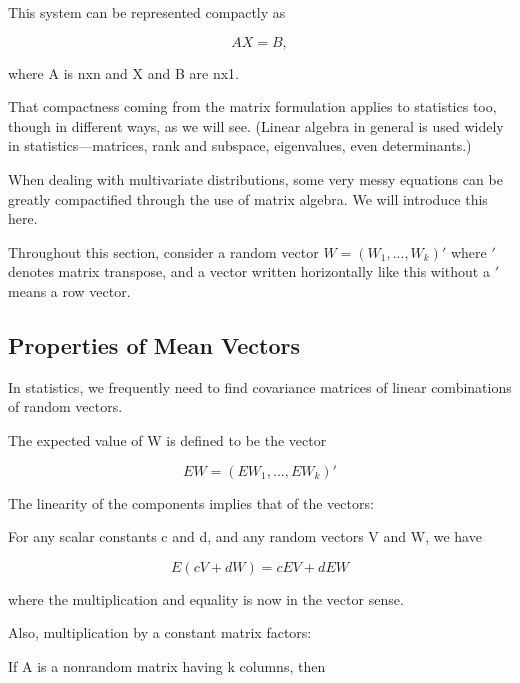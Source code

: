 This system can be represented compactly as

\begin{equation}
\label{lin}
AX = B,
\end{equation}

where A is nxn and X and B are nx1.

That compactness coming from the matrix formulation applies to
statistics too, though in different ways, as we will see.  (Linear
algebra in general is used widely in statistics---matrices, rank and
subspace, eigenvalues, even determinants.)

When dealing with multivariate distributions, some very messy equations
can be greatly compactified through the use of matrix algebra.  We will
introduce this here.

Throughout this section, consider a random vector $W = (W_1,...,W_k)'$
where $'$ denotes matrix transpose, and a vector written horizontally like
this without a $'$ means a row vector.

\subsection{Properties of Mean Vectors}

In statistics, we frequently need to find covariance matrices of linear
combinations of random vectors.

\begin{definition}

The expected value of W is defined to be the vector

\begin{equation}
\label{evalrandvec}
EW = (EW_1,...,EW_k)'
\end{equation}

\end{definition}

The linearity of the components implies that of the vectors:  

For any scalar constants c and d, and any random vectors V and W, we
have

\begin{equation}
E(cV+dW) = c EV + d EW
\end{equation}

where the multiplication and equality is now in the vector sense.

Also, multiplication by a constant matrix factors:  

If A is a nonrandom matrix having k columns, then


